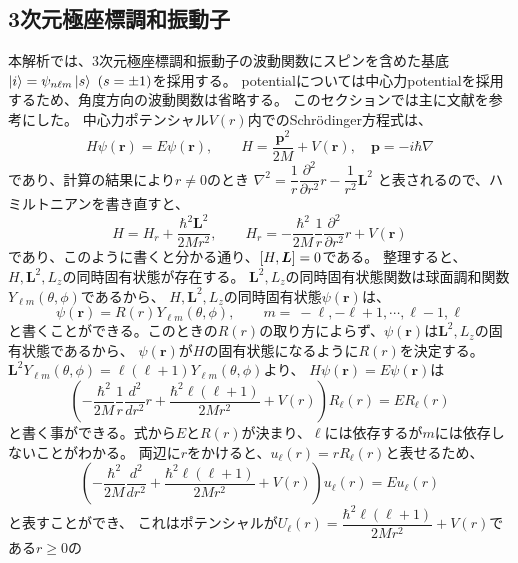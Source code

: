 \documentclass[a4paper]{jsarticle}
\begin{document}
\subsection{3次元極座標調和振動子}\label{sec.3dim}
本解析では、3次元極座標調和振動子の波動関数にスピンを含めた基底$\ket{i}=\psi_{n\ell m}\ket{s} \ (s=\pm1)$を採用する。
potentialについては中心力potentialを採用するため、角度方向の波動関数は省略する。
このセクションでは主に文献\cite{qm_a.pdf}を参考にした。
中心力ポテンシャル$V(r)$内でのSchr\"{o}dinger方程式は、
\begin{equation}
  H\psi(\bm{r})=E\psi(\bm{r}),\qquad H=\dfrac{\bm{p}^2}{2M} + V(\bm{r}),\quad\bm{p}=-i\hbar\nabla
  \label{3dim}
\end{equation}
であり、計算の結果により$r\neq0$のとき
$\nabla^2 = \dfrac{1}{r}\dfrac{\partial^2}{\partial r^2}r-\dfrac{1}{r^2}\bm{L}^2$
と表されるので、ハミルトニアンを書き直すと、
\begin{equation}
  H = H_r + \dfrac{\hbar^2\bm{L}^2}{2Mr^2},\qquad H_r = -\dfrac{\hbar^2}{2M}\dfrac{1}{r}\dfrac{\partial^2}{\partial r^2}r +V(\bm{r})
\end{equation}
であり、このように書くと分かる通り、$\comm{H}{\bm{L}}=0$である。
整理すると、$H,\bm{L}^2,L_z$の同時固有状態が存在する。
$\bm{L}^2,L_z$の同時固有状態関数は球面調和関数$Y_{\ell m}(\theta,\phi)$であるから、
$H,\bm{L}^2,L_z$の同時固有状態$\psi(\bm{r}) $は、
\begin{equation}
  \psi(\bm{r})=R(r)Y_{\ell m}(\theta,\phi),\qquad m=\ -\ell,-\ell+1,\cdots,\ell-1,\ell
\end{equation}
と書くことができる。このときの$R(r)$の取り方によらず、$\psi(\bm{r})$は$\bm{L}^2,L_z$の固有状態であるから、
$\psi(\bm{r})$が$H$の固有状態になるように$R(r)$を決定する。
$\bm{L}^2Y_{\ell m}(\theta,\phi)=\ell(\ell+1)Y_{\ell m}(\theta,\phi)$より、
$H\psi(\bm{r})=E\psi(\bm{r})$は
\begin{equation}
  \left(-\dfrac{\hbar^2}{2M}\dfrac{1}{r}\dfrac{d^2}{d r^2}r+ \dfrac{\hbar^2\ell(\ell+1)}{2Mr^2}+V(r)\right)R_\ell (r)=ER_\ell (r)
\end{equation}
と書く事ができる。式から$E$と$R(r)$が決まり、$\ell$には依存するが$m$には依存しないことがわかる。
両辺に$r$をかけると、$u_\ell(r)=rR_\ell(r)$と表せるため、
\begin{equation}
  \left(-\dfrac{\hbar^2}{2M}\dfrac{d^2}{d r^2}+ \dfrac{\hbar^2\ell(\ell+1)}{2Mr^2}+V(r)\right)u_\ell(r)=Eu_\ell(r)
  \label{1dim}
\end{equation}
と表すことができ、
これはポテンシャルが$U_\ell(r)=\dfrac{\hbar^2\ell(\ell+1)}{2Mr^2}+V(r)$である$r\ge0$の
\end{document}
